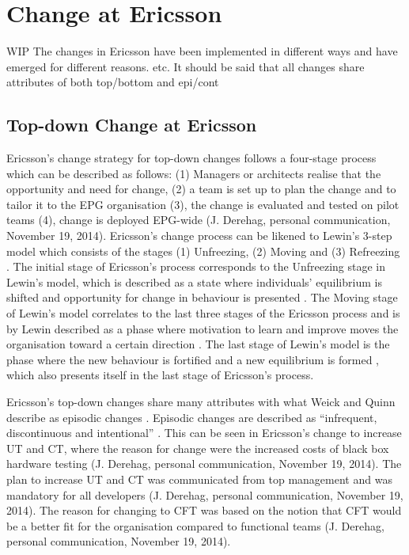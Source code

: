 \documentclass[final_report_innit.tex]{subfiles}
\begin{document}
\section{Change at Ericsson}
WIP
The changes in Ericsson have been implemented in different ways and have emerged for different reasons. etc.
It should be said that all changes share attributes of both top/bottom and epi/cont

\subsection*{Top-down Change at Ericsson}
Ericsson’s change strategy for top-down changes follows a four-stage process which can be described as follows: (1) Managers or architects realise that the opportunity and need for change, (2) a team is set up to plan the change and to tailor it to the EPG organisation (3), the change is evaluated and tested on pilot teams (4), change is deployed EPG-wide (J. Derehag, personal communication, November 19, 2014). Ericsson’s change process can be likened to Lewin’s 3-step model \cite{burnes2004kurt} which consists of the stages (1) Unfreezing, (2) Moving and (3) Refreezing \cite{burnes2004kurt}. The initial stage of Ericsson’s process corresponds to the Unfreezing stage in Lewin’s model, which is described as a state where individuals’ equilibrium is shifted and opportunity for change in behaviour is presented \cite{burnes2004kurt}. The Moving stage of Lewin’s model correlates to the last three stages of the Ericsson process and is by Lewin described as a phase where motivation to learn and improve moves the organisation toward a certain direction \cite{burnes2004kurt}. The last stage of Lewin’s model is the phase where the new behaviour is fortified and a new equilibrium is formed \cite{burnes2004kurt}, which also presents itself in the last stage of Ericsson’s process. 

Ericsson’s top-down changes share many attributes with what Weick and Quinn describe as episodic changes \cite{weick1999organizational}. Episodic changes are described as “infrequent, discontinuous and intentional” \cite{weick1999organizational}. This can be seen in Ericsson’s change to increase UT and CT, where the reason for change were the increased costs of black box hardware testing (J. Derehag, personal communication, November 19, 2014). The plan to increase UT and CT was communicated from top management and was mandatory for all developers (J. Derehag, personal communication, November 19, 2014). The reason for changing to CFT was based on the notion that CFT would be a better fit for the organisation compared to functional teams (J. Derehag, personal communication, November 19, 2014). 
\end{document}

